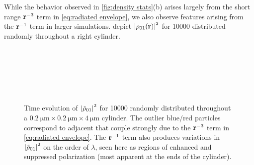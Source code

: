 While the behavior observed in \cref{fig:density stats}(b) arises largely from the short range $\vb{r}^{-3}$ term in \cref{eq:radiated envelope}, we also observe features arising from the $\vb{r}^{-1}$ term in larger simulations.
 depict $\abs{\rho_{01}(\vb{r})}^2$ for \num{10000} \qds{} distributed randomly throughout a right cylinder.


\begin{figure}
  \centering
   \\
   \\
   \\
   \\
   \\
  \caption{\label{fig:tubes}
    Time evolution of $\abs{\tilde{\rho}_{01}}^2$ for \num{10000} \qds{} randomly distributed throughout a $\SI{0.2}{\micro\meter} \times \SI{0.2}{\micro\meter} \times \SI{4}{\micro\meter}$ cylinder.
    The outlier blue/red particles correspond to adjacent \qds{} that couple strongly due to the $\vb{r}^{-3}$ term in \cref{eq:radiated envelope}.
    The $\vb{r}^{-1}$ term also produces variations in $\abs{\tilde{\rho}_{01}}^2$ on the order of $\lambda$, seen here as regions of enhanced and suppressed polarization (most apparent at the ends of the cylinder).
  }
\end{figure}

